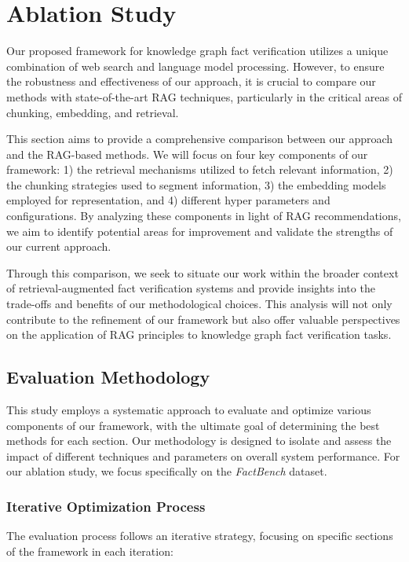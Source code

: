 \chapter{Ablation Study}
\label{ch:ablation}
Our proposed framework for knowledge graph fact verification utilizes a unique combination of web search and language model processing.
However, to ensure the robustness and effectiveness of our approach, it is crucial to compare our methods with state-of-the-art RAG techniques, particularly in the critical areas of chunking, embedding, and retrieval.

This section aims to provide a comprehensive comparison between our approach and the RAG-based methods.
We will focus on four key components of our framework: 1) the retrieval mechanisms utilized to fetch relevant information, 2) the chunking strategies used to segment information, 3) the embedding models employed for representation, and 4) different hyper parameters and configurations.
By analyzing these components in light of RAG recommendations, we aim to identify potential areas for improvement and validate the strengths of our current approach.

Through this comparison, we seek to situate our work within the broader context of retrieval-augmented fact verification systems and provide insights into the trade-offs and benefits of our methodological choices.
This analysis will not only contribute to the refinement of our framework but also offer valuable perspectives on the application of RAG principles to knowledge graph fact verification tasks.
\section{Evaluation Methodology}\label{sec:evaluation-methodology}
This study employs a systematic approach to evaluate and optimize various components of our framework, with the ultimate goal of determining the best methods for each section.
Our methodology is designed to isolate and assess the impact of different techniques and parameters on overall system performance.
For our ablation study, we focus specifically on the \textit{FactBench} dataset.

\subsection{Iterative Optimization Process}\label{subsec:iterative-optimization-process}
The evaluation process follows an iterative strategy, focusing on specific sections of the framework in each iteration:

